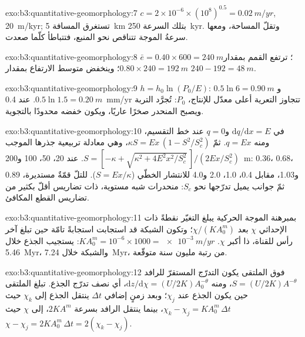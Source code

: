 \begin{solution}{exo:b3:quantitative-geomorphology:7}
$c = 2\times10^{-6}\times(10^8)^{0.5} = \qty{0.02}{m/yr}$, \qty{20}{m/kyr};
تستغرق المسافة \qty{5}{km} بتلك السرعة \qty{250}{kyr}. وتقلّ المساحة، ومعها
سرعةُ الموجة تتناقص نحو المنبع، فتتباطأ  كلّما صعدت.
\end{solution}

\begin{solution}{exo:b3:quantitative-geomorphology:8}
$\bar e = 0.40\times600 = \qty{240}{m}$؛ ترتفع القمم بمقدار $0.80\times240 =
\qty{192}{m}$؛ وينخفض متوسط الارتفاع بمقدار $240 - 192 = \qty{48}{m}$.
\end{solution}

\begin{solution}{exo:b3:quantitative-geomorphology:9}
$h = h_0\ln(P_0/E)$: $0.5\ln 6 = \qty{0.90}{m}$ و$0.5\ln1.5 =
\qty{0.20}{m}$. عند \qty{0.4}{mm/yr} تتجاوز التعرية أعلى معدّل للإنتاج،
$P_0$: تُجرَّد التربة ويصبح المنحدر صخرًا عاريًا، ويكون خفضه
محدودًا بالتجوية.
\end{solution}

\begin{solution}{exo:b3:quantitative-geomorphology:10}
في  $\mathrm{d}q/\mathrm{d}x = E$ و$q = 0$ عند خط التقسيم، ومنه
$q = E x$. ثمّ $\kappa S = E x\,(1 - S^2/S_c^2)$، وهي معادلة تربيعية
جذرها الموجب $S = [-\kappa + \sqrt{\kappa^2 + 4E^2x^2/S_c^2}\,]/(2Ex/S_c^2)$. عند
20، 50، 100 و\qty{200}{m}: 0.36، 0.68، 0.89 و1.03، مقابل 0.4، 1.0،
2.0 و4.0 للانتشار الخطّي ($S = Ex/\kappa$). للتلّ قمّةٌ
مستديرة، ثمّ جوانب يميل تدرّجها نحو $S_c$: منحدرات شبه مستوية، ذات
تضاريس أقلّ بكثير من تضاريس القطع المكافئ.
\end{solution}

\begin{solution}{exo:b3:quantitative-geomorphology:11}
بمبرهنة الموجة الحركية يبلغ التغيّر نقطةً ذات الإحداثي
$\chi$ بعد $\chi/(KA_0^m)$؛ وتكون الشبكة قد استجابت استجابةً تامّة حين تبلغ
آخر رأس للقناة، ذا أكبر $\chi$. $K A_0^m = 10^{-6}\times
1000 = \qty{e-3}{m/yr}$: يستجيب الجذع خلال \qty{5.46}{Myr}، والشبكة
خلال \qty{7.24}{Myr}، من رتبة مليون سنة متوقّعة.
\end{solution}

\begin{solution}{exo:b3:quantitative-geomorphology:12}
فوق الملتقى يكون التدرّج المستقرّ للرافد $S = (U/2K)A^{-\theta}$،
ومنه $\mathrm{d}z/\mathrm{d}\chi = (U/2K)A_0^{-\theta}$، أي نصف تدرّج الجذع.
تبلغ  الملتقى حين يكون الجذع عند $\chi_j$؛ وبعد
زمنٍ إضافي $\Delta t$ ينتقل الجذع إلى $\chi_k$ حيث $\chi_k -
\chi_j = K A_0^m\,\Delta t$، بينما ينتقل الرافد بسرعة $2KA^m$،
إلى $\chi$ حيث $\chi - \chi_j = 2KA_0^m\,\Delta t = 2(\chi_k -
\chi_j)$.
\end{solution}

